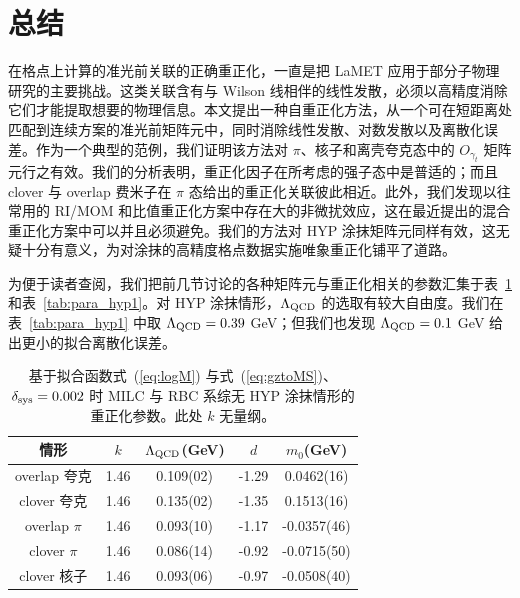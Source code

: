 \section{总结}\label{sec:summary}

在格点上计算的准光前关联的正确重正化，一直是把 LaMET 应用于部分子物理研究的主要挑战。这类关联含有与 Wilson 线相伴的线性发散，必须以高精度消除它们才能提取想要的物理信息。本文提出一种自重正化方法，从一个可在短距离处匹配到连续方案的准光前矩阵元中，同时消除线性发散、对数发散以及离散化误差。作为一个典型的范例，我们证明该方法对 $\pi$、核子和离壳夸克态中的 $O_{\gamma_t}$ 矩阵元行之有效。我们的分析表明，重正化因子在所考虑的强子态中是普适的；而且 clover 与 overlap 费米子在 $\pi$ 态给出的重正化关联彼此相近。此外，我们发现以往常用的 RI/MOM 和比值重正化方案中存在大的非微扰效应，这在最近提出的混合重正化方案中可以并且必须避免。我们的方法对 HYP 涂抹矩阵元同样有效，这无疑十分有意义，为对涂抹的高精度格点数据实施唯象重正化铺平了道路。

为便于读者查阅，我们把前几节讨论的各种矩阵元与重正化相关的参数汇集于表~\ref{tab:para_hyp0} 和表~\ref{tab:para_hyp1}。对 HYP 涂抹情形，$\Lambda_{\rm QCD}$ 的选取有较大自由度。我们在表~\ref{tab:para_hyp1} 中取 $\Lambda_{\rm QCD}=0.39$ GeV；但我们也发现 $\Lambda_{\rm QCD}=0.1$ GeV 给出更小的拟合离散化误差。


\begin{table}[htbp]
  \centering
  \begin{tabular}{c|cccc}
  \toprule
 情形 & $k$ & $\Lambda_{\rm QCD}$(GeV) & $d$ & $m_{0}$(GeV) \\
\hline
overlap 夸克 & 1.46 & 0.109(02) & -1.29 & 0.0462(16)\\
\hline
clover 夸克 & 1.46 & 0.135(02) & -1.35 & 0.1513(16)\\
\hline
overlap $\pi$ & 1.46 & 0.093(10) & -1.17 & -0.0357(46)\\
\hline
clover $\pi$ & 1.46 & 0.086(14) & -0.92 &  -0.0715(50)\\
\hline
clover 核子 & 1.46 & 0.093(06) & -0.97 &  -0.0508(40)\\
\hline
  \end{tabular}
  \caption{基于拟合函数式~(\ref{eq:logM}) 与式~(\ref{eq:gztoMS})、$\delta_{\rm sys}=0.002$ 时 MILC 与 RBC 系综无 HYP 涂抹情形的重正化参数。此处 $k$ 无量纲。}
  \label{tab:para_hyp0}
\end{table}


